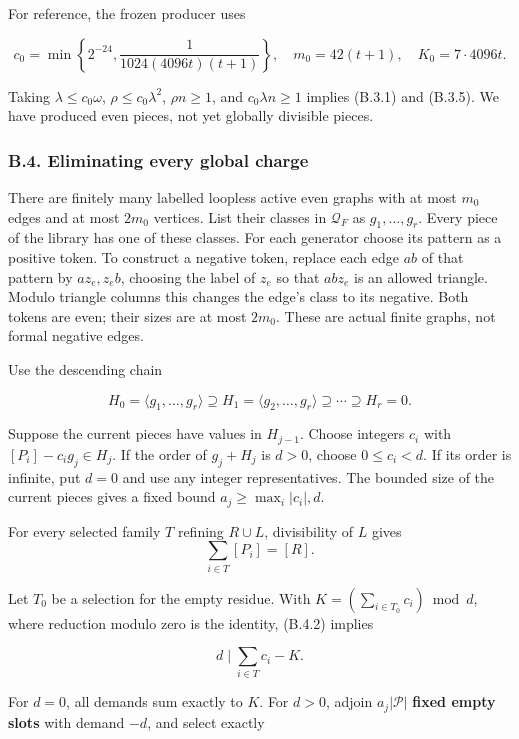\documentclass[english,11pt,a4paper]{article}
\begin{document}
For reference, the frozen producer uses

\[c_0=\min\left\{2^{-24},\frac1{1024(4096t)(t+1)}\right\},\quad
m_0=42(t+1),\quad K_0=7\cdot4096t.
\tag{B.3.6}\]

Taking \(\lambda\le c_0\omega\), \(\rho\le c_0\lambda^2\), \(\rho n\ge1\), and \(c_0\lambda n\ge1\) implies (B.3.1) and (B.3.5). We have produced even pieces, not yet globally divisible pieces.

\subsubsection{B.4. Eliminating every global charge}\label{b.4.-eliminating-every-global-charge}

There are finitely many labelled loopless active even graphs with at most \(m_0\) edges and at most \(2m_0\) vertices. List their classes in \(\mathcal Q_F\) as \(g_1,\ldots,g_r\). Every piece of the library has one of these classes. For each generator choose its pattern as a positive token. To construct a negative token, replace each edge \(ab\) of that pattern by \(az_e,z_eb\), choosing the label of \(z_e\) so that \(abz_e\) is an allowed triangle. Modulo triangle columns this changes the edge's class to its negative. Both tokens are even; their sizes are at most \(2m_0\). These are actual finite graphs, not formal negative edges.

Use the descending chain

\[H_0=\langle g_1,\ldots,g_r\rangle\supseteq H_1
=\langle g_2,\ldots,g_r\rangle\supseteq\cdots\supseteq H_r=0.
\tag{B.4.1}\]

Suppose the current pieces have values in \(H_{j-1}\). Choose integers \(c_i\) with \([P_i]-c_ig_j\in H_j\). If the order of \(g_j+H_j\) is \(d>0\), choose \(0\le c_i<d\). If its order is infinite, put \(d=0\) and use any integer representatives. The bounded size of the current pieces gives a fixed bound \(a_j\ge\max_i|c_i|,d\).

For every selected family \(T\) refining \(R\cup L\), divisibility of \(L\) gives \[\sum_{i\in T}[P_i]=[R].
\tag{B.4.2}\]

Let \(T_0\) be a selection for the empty residue. With \(K=(\sum_{i\in T_0}c_i)\bmod d\), where reduction modulo zero is the identity, (B.4.2) implies

\[d\mid \sum_{i\in T}c_i-K.
\tag{B.4.3}\]

For \(d=0\), all demands sum exactly to \(K\). For \(d>0\), adjoin \(a_j|\mathcal P|\) \textbf{fixed empty slots} with demand \(-d\), and select exactly
\end{document}
